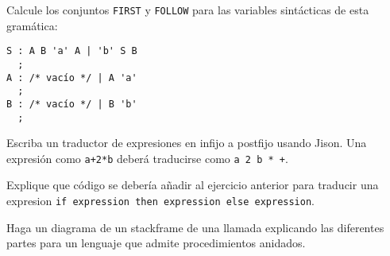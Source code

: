 \item 
Calcule los conjuntos \verb|FIRST| y \verb|FOLLOW| para las variables
sintácticas de esta gramática:
\begin{verbatim}
S : A B 'a' A | 'b' S B
  ;
A : /* vacío */ | A 'a' 
  ;
B : /* vacío */ | B 'b'
  ;
\end{verbatim}

\item 
Escriba un traductor de expresiones en infijo a postfijo usando Jison.
Una expresión como \verb|a+2*b| deberá traducirse como
\verb|a 2 b * +|.

\item 
Explique que código se debería añadir al
ejercicio anterior para traducir una expresion
\verb|if expression then expression else expression|.

\item 
Haga un diagrama de un stackframe de una llamada explicando
las diferentes partes para un lenguaje que admite procedimientos 
anidados.

